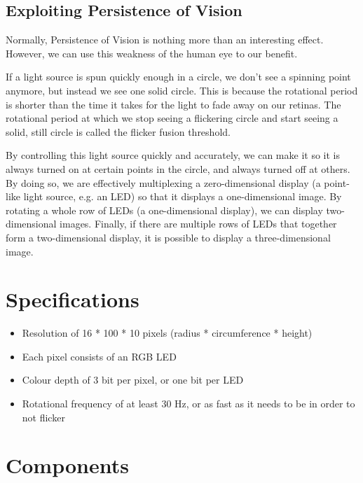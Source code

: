 \documentclass[a4paper, 11pt, titlepage]{report}
\begin{document}
\subsection{Exploiting Persistence of Vision}

Normally, Persistence of Vision is nothing more than an interesting effect. However, we can
use this weakness of the human eye to our benefit.

If a light source is spun quickly enough in a circle, we don't see a spinning
point anymore, but instead we see one solid circle. This is because the rotational period is
shorter than the time it takes for the light to fade away on our retinas. The rotational period
at which we stop seeing a flickering circle and start seeing a solid, still circle is called
the flicker fusion threshold.

By controlling this light source quickly and accurately, we can make it so it is always turned
on at certain points in the circle, and always turned off at others. By doing so, we are
effectively multiplexing a zero-dimensional display (a point-like light source, e.g. an LED)
so that it displays a one-dimensional image. By rotating a whole row of LEDs (a one-dimensional
display), we can display two-dimensional images. Finally, if there are multiple rows of LEDs
that together form a two-dimensional display, it is possible to display a three-dimensional
image.


\section{Specifications}

\begin{itemize}

	\item Resolution of 16 * 100 * 10 pixels (radius * circumference * height)
	\item Each pixel consists of an RGB LED
	\item Colour depth of 3 bit per pixel, or one bit per LED
	\item Rotational frequency of at least 30 Hz, or as fast as it needs to be in order to not flicker

\end{itemize}




\section{Components}
\end{document}
